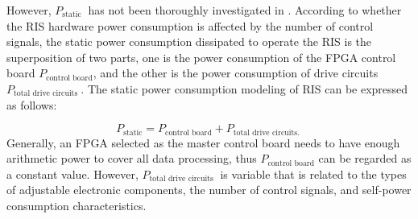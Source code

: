 \documentclass[journal]{IEEEtran}
\begin{document}
However, $P_{\text {static }}$ has not been thoroughly investigated in \cite{wang2022reconfigurable}. According to whether the RIS hardware power consumption is affected by the number of control signals, the static power consumption dissipated to operate the RIS is the superposition of two parts, one is the power consumption of the FPGA control board $P_{\text {control board}}$, and the other is the power consumption of drive circuits $P_{\text {total drive circuits }}$. The static power consumption modeling of RIS can be expressed as follows:

\begin{equation}
P_{\mathrm{static}}=P_{\text {control board}}+P_{\text {total drive circuits. }}
\end{equation}
Generally, an FPGA selected as the master control board needs to have enough arithmetic power to cover all data processing, thus $P_{\text {control board}}$ can be regarded as a constant value. However, $P_{\text {total drive circuits }}$ is variable that is related to the types of adjustable electronic components, the number of control signals, and self-power consumption characteristics.
\end{document}
